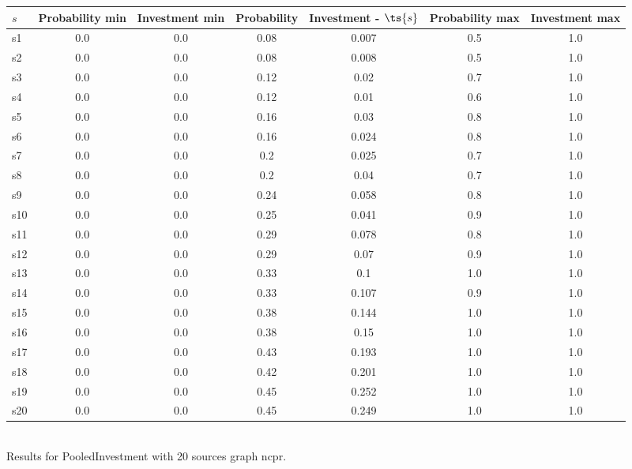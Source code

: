 \documentclass{article}
\begin{document}
\noindent\begin{tabular}{|l|c|c|c|c|c|c|}
\hline
$s$& Probability min & Investment min & Probability & Investment - $\ts{s}$ & Probability max & Investment max\\
\hline
s1 &0.0 & 0.0 & 0.08 & 0.007 & 0.5 & 1.0\\
\hline
s2 &0.0 & 0.0 & 0.08 & 0.008 & 0.5 & 1.0\\
\hline
s3 &0.0 & 0.0 & 0.12 & 0.02 & 0.7 & 1.0\\
\hline
s4 &0.0 & 0.0 & 0.12 & 0.01 & 0.6 & 1.0\\
\hline
s5 &0.0 & 0.0 & 0.16 & 0.03 & 0.8 & 1.0\\
\hline
s6 &0.0 & 0.0 & 0.16 & 0.024 & 0.8 & 1.0\\
\hline
s7 &0.0 & 0.0 & 0.2 & 0.025 & 0.7 & 1.0\\
\hline
s8 &0.0 & 0.0 & 0.2 & 0.04 & 0.7 & 1.0\\
\hline
s9 &0.0 & 0.0 & 0.24 & 0.058 & 0.8 & 1.0\\
\hline
s10 &0.0 & 0.0 & 0.25 & 0.041 & 0.9 & 1.0\\
\hline
s11 &0.0 & 0.0 & 0.29 & 0.078 & 0.8 & 1.0\\
\hline
s12 &0.0 & 0.0 & 0.29 & 0.07 & 0.9 & 1.0\\
\hline
s13 &0.0 & 0.0 & 0.33 & 0.1 & 1.0 & 1.0\\
\hline
s14 &0.0 & 0.0 & 0.33 & 0.107 & 0.9 & 1.0\\
\hline
s15 &0.0 & 0.0 & 0.38 & 0.144 & 1.0 & 1.0\\
\hline
s16 &0.0 & 0.0 & 0.38 & 0.15 & 1.0 & 1.0\\
\hline
s17 &0.0 & 0.0 & 0.43 & 0.193 & 1.0 & 1.0\\
\hline
s18 &0.0 & 0.0 & 0.42 & 0.201 & 1.0 & 1.0\\
\hline
s19 &0.0 & 0.0 & 0.45 & 0.252 & 1.0 & 1.0\\
\hline
s20 &0.0 & 0.0 & 0.45 & 0.249 & 1.0 & 1.0\\
\hline
\end{tabular}\\

\noindent Results for PooledInvestment with 20 sources graph ncpr.
\end{document}
